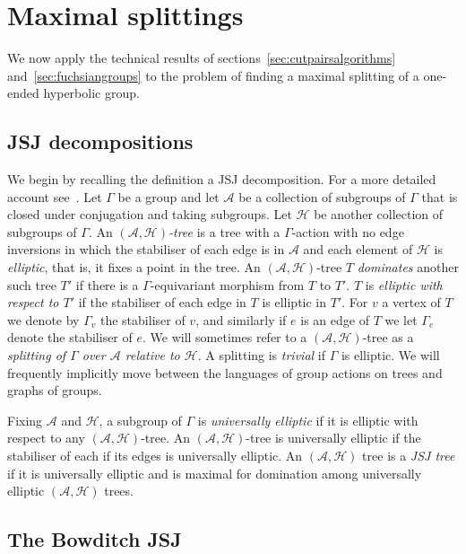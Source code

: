 \section{Maximal splittings}\label{sec:maximal}

We now apply the technical results of sections~\ref{sec:cutpairsalgorithms}
and~\ref{sec:fuchsiangroups} to the problem of finding a maximal splitting of a
one-ended hyperbolic group.

\subsection{JSJ decompositions}

We begin by recalling the definition a JSJ decomposition. For a more detailed
account see~\cite{guirardellevitt16}. Let $\Gamma$ be a group and let
$\mathcal{A}$ be a collection of subgroups of $\Gamma$ that is closed under
conjugation and taking subgroups. Let $\mathcal{H}$ be another collection of
subgroups of $\Gamma$. An \emph{$(\mathcal{A}, \mathcal{H})$-tree} is a tree
with a $\Gamma$-action with no edge inversions in which the stabiliser of each
edge is in $\mathcal{A}$ and each element of $\mathcal{H}$ is \emph{elliptic},
that is, it fixes a point in the tree. An $(\mathcal{A}, \mathcal{H})$-tree $T$
\emph{dominates} another such tree $T'$ if there is a $\Gamma$-equivariant
morphism from $T$ to $T'$.  $T$ is \emph{elliptic with respect to $T'$} if the
stabiliser of each edge in $T$ is elliptic in $T'$. For $v$ a vertex of $T$ we
denote by $\Gamma_v$ the stabiliser of $v$, and similarly if $e$ is an edge of
$T$ we let $\Gamma_e$ denote the stabiliser of $e$. We will sometimes refer to
a $(\mathcal{A}, \mathcal{H})$-tree as a \emph{splitting of $\Gamma$ over
$\mathcal{A}$ relative to $\mathcal{H}$}. A splitting is \emph{trivial} if
$\Gamma$ is elliptic. We will frequently implicitly move between the languages
of group actions on trees and graphs of groups.

Fixing $\mathcal{A}$ and $\mathcal{H}$, a subgroup of $\Gamma$ is
\emph{universally elliptic} if it is elliptic with respect to any
$(\mathcal{A}, \mathcal{H})$-tree. An $(\mathcal{A}, \mathcal{H})$-tree is
universally elliptic if the stabiliser of each if its edges is universally
elliptic. An $(\mathcal{A}, \mathcal{H})$ tree is a \emph{JSJ tree} if it is
universally elliptic and is maximal for domination among universally elliptic
$(\mathcal{A}, \mathcal{H})$ trees. 

\subsection{The Bowditch JSJ}

